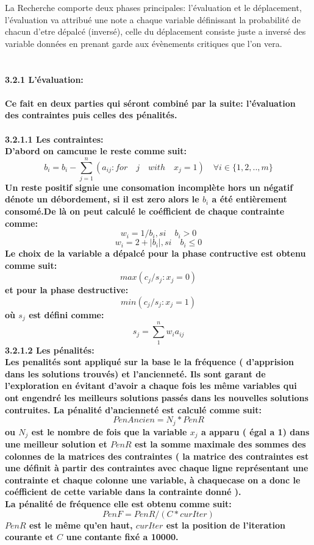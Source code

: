 \documentclass[20pt, a4paper, french]{report}
\begin{document}
\large{
La Recherche comporte deux phases principales: l'évaluation et le déplacement, l'évaluation va attribué une note a chaque variable définissant la probabilité de chacun d'etre dépalcé (inversé), celle du déplacement consiste juste a inversé des variable données en prenant garde aux évènements critiques que l'on vera.\\\\\\
\bfseries{\LARGE 3.2.1 L'évaluation: }\\\\
Ce fait en deux parties qui séront combiné par la suite: l'évaluation des contraintes puis celles des pénalités.\\\\
\bfseries{\Large 3.2.1.1 Les contraintes: }\\
D'abord on camcume le reste comme suit:
\[
    b_i = b_i - \sum_{j=1}^{n} (a_{ij} : for \quad j \quad with \quad x_j = 1) \quad \forall i \in \{1,2,..,m\}
\]
Un reste positif signie une consomation incomplète hors un négatif dénote un débordement, si il est zero alors le \(b_i\) a été entièrement consomé.De là on peut calculé le coéfficient de chaque contrainte comme:
\[
w_i = 1/b_i, si \quad b_i > 0    
\] 
\[
w_i =  2 + |b_i|, si \quad b_i \leq 0    
\]
Le choix de la variable a dépalcé pour la phase contructive  est obtenu comme suit:
\[
max(c_j / s_j : x_j = 0)   
\]
et pour la phase destructive: 
\[
min(c_j / s_j : x_j = 1)   
\]
où \(s_j\) est défini comme:
\[
 s_j = \sum_{1}^{n}w_ia_{ij}   
\]
\bfseries{\Large 3.2.1.2 Les pénalités: }\\
Les penalités sont appliqué sur la base le la fréquence ( d'apprision dans les solutions trouvés) et l'ancienneté. Ils sont garant de l'exploration en évitant d'avoir a chaque fois les même variables qui ont engendré les meilleurs solutions passés dans les nouvelles solutions contruites. La pénalité d'ancienneté est calculé comme suit: 
\[
    PenAncien = N_j*PenR   
\]
ou \(N_j\) est le nombre de fois que la variable \(x_j\) a apparu ( égal a 1) dans une meilleur solution et \(PenR\) est la somme maximale des sommes des colonnes de la matrices des contraintes ( la matrice des contraintes est une définit à partir des contraintes avec chaque ligne représentant une contrainte et chaque colonne une variable, à chaquecase on a donc le coéfficient de cette variable dans la contrainte donné ).\\
La pénalité de fréquence elle est obtenu comme suit:
\[
    PenF = PenR/(C*curIter)   
\]
\(PenR\) est le même qu'en haut, \(curIter\) est la position de l'iteration courante et \(C\) une contante fixé a 10000.\\
}
\end{document}
